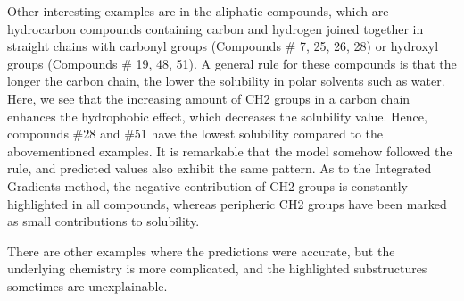 Other interesting examples are in the aliphatic compounds, which are hydrocarbon compounds containing carbon and hydrogen joined together in straight chains with carbonyl groups (Compounds \# 7, 25, 26, 28) or hydroxyl groups (Compounds \# 19, 48, 51). A general rule for these compounds is that the longer the carbon chain, the lower the solubility in polar solvents such as water. Here, we see that the increasing amount of CH2 groups in a carbon chain enhances the hydrophobic effect, which decreases the solubility value. Hence, compounds \#28 and \#51 have the lowest solubility compared to the abovementioned examples. It is remarkable that the model somehow followed the rule, and predicted values also exhibit the same pattern. As to the Integrated Gradients method, the negative contribution of CH2 groups is constantly highlighted in all compounds, whereas peripheric CH2 groups have been marked as small contributions to solubility. 

There are other examples where the predictions were accurate, but the underlying chemistry is more complicated, and the highlighted substructures sometimes are unexplainable. 
